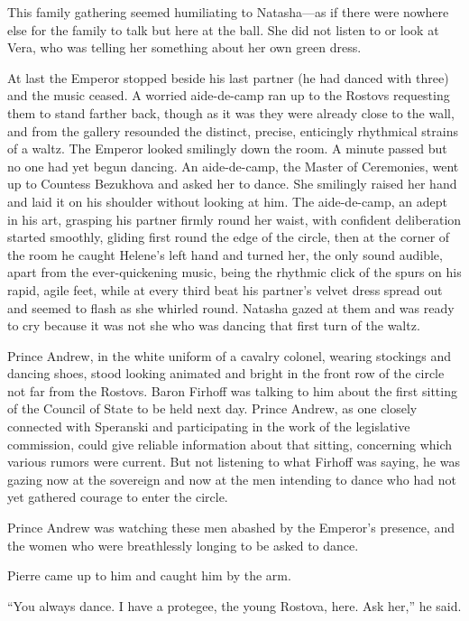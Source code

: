 This family gathering seemed humiliating to Natasha---as if there
were nowhere else for the family to talk but here at the
ball. She did not listen to or look at Vera, who was telling her
something about her own green dress.

At last the Emperor stopped beside his last partner (he had
danced with three) and the music ceased. A worried aide-de-camp
ran up to the Rostovs requesting them to stand farther back,
though as it was they were already close to the wall, and from
the gallery resounded the distinct, precise, enticingly
rhythmical strains of a waltz. The Emperor looked smilingly down
the room. A minute passed but no one had yet begun dancing. An
aide-de-camp, the Master of Ceremonies, went up to Countess
Bezukhova and asked her to dance. She smilingly raised her hand
and laid it on his shoulder without looking at him. The
aide-de-camp, an adept in his art, grasping his partner firmly
round her waist, with confident deliberation started smoothly,
gliding first round the edge of the circle, then at the corner of
the room he caught Helene's left hand and turned her, the only
sound audible, apart from the ever-quickening music, being the
rhythmic click of the spurs on his rapid, agile feet, while at
every third beat his partner's velvet dress spread out and seemed
to flash as she whirled round. Natasha gazed at them and was
ready to cry because it was not she who was dancing that first
turn of the waltz.

Prince Andrew, in the white uniform of a cavalry colonel, wearing
stockings and dancing shoes, stood looking animated and bright in
the front row of the circle not far from the Rostovs. Baron
Firhoff was talking to him about the first sitting of the Council
of State to be held next day. Prince Andrew, as one closely
connected with Speranski and participating in the work of the
legislative commission, could give reliable information about
that sitting, concerning which various rumors were current. But
not listening to what Firhoff was saying, he was gazing now at
the sovereign and now at the men intending to dance who had not
yet gathered courage to enter the circle.

Prince Andrew was watching these men abashed by the Emperor's
presence, and the women who were breathlessly longing to be asked
to dance.

Pierre came up to him and caught him by the arm.

``You always dance. I have a protegee, the young Rostova,
here. Ask her,'' he said.

